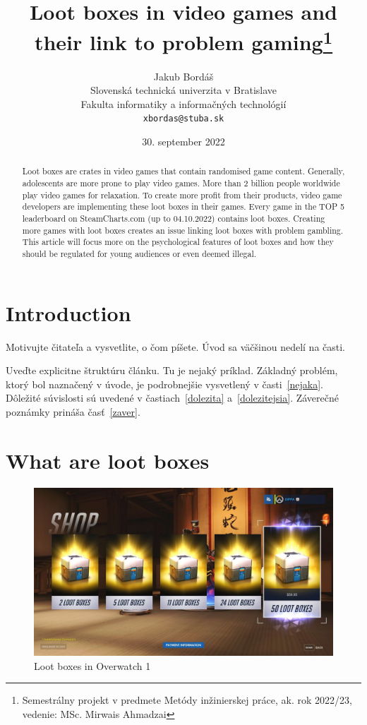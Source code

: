 \documentclass[10pt,oneside,english,a4paper]{article}
\title{Loot boxes in video games and their link to problem gaming\thanks{Semestrálny projekt v predmete Metódy inžinierskej práce, ak. rok 2022/23, vedenie: MSc. Mirwais Ahmadzai}} %
\author{Jakub Bordáš\\[2pt]
	{\small Slovenská technická univerzita v Bratislave}\\
	{\small Fakulta informatiky a informačných technológií}\\
	{\small \texttt{xbordas@stuba.sk}}
	}
\date{\small 30. september 2022} %
\begin{document}
\maketitle

\begin{abstract}
Loot boxes are crates in video games that contain randomised game content. Generally, adolescents are more prone to play video games. More than 2 billion people worldwide play video games for relaxation. To create more profit from their products, video game developers are implementing these loot boxes in their games. Every game in the TOP 5 leaderboard on SteamCharts.com (up to 04.10.2022) contains loot boxes. Creating more games with loot boxes creates an issue linking loot boxes with problem gambling. This article will focus more on the psychological features of loot boxes and how they should be regulated for young audiences or even deemed illegal.
\end{abstract}



\section{Introduction}

Motivujte čitateľa a vysvetlite, o čom píšete. Úvod sa väčšinou nedelí na časti.

Uveďte explicitne štruktúru článku. Tu je nejaký príklad.
Základný problém, ktorý bol naznačený v úvode, je podrobnejšie vysvetlený v časti~\ref{nejaka}.
Dôležité súvislosti sú uvedené v častiach~\ref{dolezita} a~\ref{dolezitejsia}.
Záverečné poznámky prináša časť~\ref{zaver}.

\pagebreak



\section{What are loot boxes} \label{sec:what}

\begin{figure}
	\centering
	\includegraphics[width=\columnwidth]{img1}
	\caption{Loot boxes in Overwatch 1}
	\label{fig:img1}
\end{figure}
\end{document}
